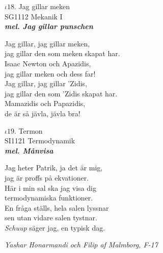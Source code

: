 \documentclass[a6paper,10pt]{article}
\newcommand{\mel}[1]{\small\textbf{\textit{mel. #1 \\}}}
\begin{document}
\setlength{\oddsidemargin}{-0.37in}
\noindent
\begin{center}
\Large $\iota18$. Jag gillar meken \\
\footnotesize SG1112 Mekanik I\\
\mel{Jag gillar punschen}
\end{center}
Jag gillar, jag gillar meken, \\
jag gillar den som meken skapat har. \\
Isaac Newton och Apazidis, \\
jag gillar meken och dess far!
\vspace{5pt} \\
Jag gillar, jag gillar 'Zidis, \\
jag gillar den som 'Zidis skapat har. \\
Mamazidis och Papazidis, \\
de är så jävla, jävla bra!

\vspace{20pt}
\begin{center}
\Large $\iota19$. Termon \\
\footnotesize SI1121 Termodynamik\\
\mel{Månvisa}
\end{center}
Jag heter Patrik, ja det är mig, \\
jag är proffs på ekvationer. \\
Här i min sal ska jag visa dig \\
termodynamiska funktioner. \\
En fråga ställs, hela salen lyssnar \\
sen utan vidare salen tystnar. \\
\textit{Schuup} säger jag, en typisk dag. 
\begin{flushright}
\textit{Yashar Honarmandi och Filip af Malmborg, F-17}
\end{flushright}
\end{document}
